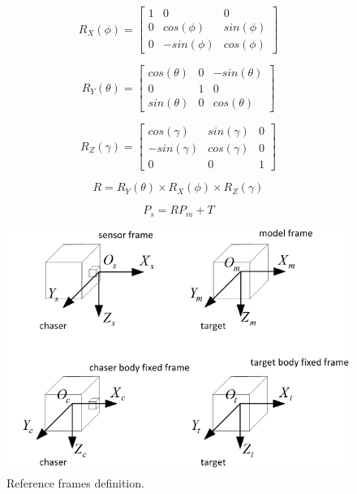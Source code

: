 \documentclass[conference]{IEEEtran}
\begin{document}
		\begin{equation}
		 	\label{eqn:Rx}
			R_X(\phi) = 
			\begin{bmatrix}
				1  & 0 & 0 \\
				0 & cos(\phi) & sin(\phi) \\
				0 & -sin(\phi) & cos(\phi)
			\end{bmatrix}
		\end{equation}
	
		\begin{equation}
			\label{eqn:Ry}
			R_Y(\theta) = 
			\begin{bmatrix}
				cos(\theta)  & 0 & -sin(\theta) \\
				0 & 1 & 0 \\
				sin(\theta) & 0 & cos(\theta)
			\end{bmatrix}
		\end{equation}
	
		\begin{equation}
			\label{eqn:Rz}
			R_Z(\gamma) = 
			\begin{bmatrix}
				cos(\gamma)  & sin(\gamma) & 0 \\
				-sin(\gamma) & cos(\gamma) & 0 \\
				0 & 0 & 1
			\end{bmatrix}
		\end{equation}
	
		\begin{equation}
			\label{eqn:R}
			R = R_Y(\theta) \times R_X(\phi) \times R_Z(\gamma)
		\end{equation}
	
		\begin{equation}
			\label{eqn:Ps}
			P_s = RP_m + T
		\end{equation}
	
	\begin{figure}[htbp]
		\centerline{\includegraphics[scale=0.95]{Images/ReferenceFrames.PNG}}
		\caption{Reference frames definition.}
		\label{ReferenceFrames}
	\end{figure}
\end{document}
